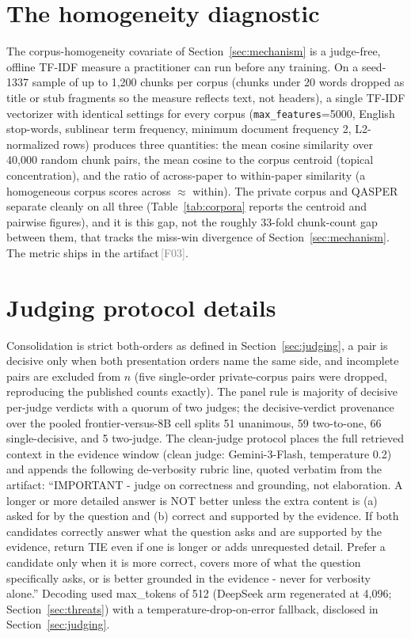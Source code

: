 \documentclass[11pt]{article}
\newcommand{\rcpt}[1]{\textcolor{gray}{\,\textsf{\scriptsize[#1]}}}
\begin{document}


\section{The homogeneity diagnostic}
\label{app:homogeneity}
The corpus-homogeneity covariate of Section~\ref{sec:mechanism} is a judge-free, offline TF-IDF measure a practitioner can run before any training. On a seed-1337 sample of up to 1{,}200 chunks per corpus (chunks under 20 words dropped as title or stub fragments so the measure reflects text, not headers), a single TF-IDF vectorizer with identical settings for every corpus (\texttt{max\_features}=5000, English stop-words, sublinear term frequency, minimum document frequency 2, L2-normalized rows) produces three quantities: the mean cosine similarity over 40{,}000 random chunk pairs, the mean cosine to the corpus centroid (topical concentration), and the ratio of across-paper to within-paper similarity (a homogeneous corpus scores across $\approx$ within). The private corpus and QASPER separate cleanly on all three (Table~\ref{tab:corpora} reports the centroid and pairwise figures), and it is this gap, not the roughly 33-fold chunk-count gap between them, that tracks the miss-win divergence of Section~\ref{sec:mechanism}. The metric ships in the artifact\rcpt{F03}.

\section{Judging protocol details}
\label{app:judging}
Consolidation is strict both-orders as defined in Section~\ref{sec:judging}, a pair is decisive only when both presentation orders name the same side, and incomplete pairs are excluded from $n$ (five single-order private-corpus pairs were dropped, reproducing the published counts exactly). The panel rule is majority of decisive per-judge verdicts with a quorum of two judges; the decisive-verdict provenance over the pooled frontier-versus-8B cell splits 51 unanimous, 59 two-to-one, 66 single-decisive, and 5 two-judge. The clean-judge protocol places the full retrieved context in the evidence window (clean judge: Gemini-3-Flash, temperature 0.2) and appends the following de-verbosity rubric line, quoted verbatim from the artifact: ``IMPORTANT - judge on correctness and grounding, not elaboration. A longer or more detailed answer is NOT better unless the extra content is (a) asked for by the question and (b) correct and supported by the evidence. If both candidates correctly answer what the question asks and are supported by the evidence, return TIE even if one is longer or adds unrequested detail. Prefer a candidate only when it is more correct, covers more of what the question specifically asks, or is better grounded in the evidence - never for verbosity alone.'' Decoding used max\_tokens of 512 (DeepSeek arm regenerated at 4{,}096; Section~\ref{sec:threats}) with a temperature-drop-on-error fallback, disclosed in Section~\ref{sec:judging}.
\end{document}
